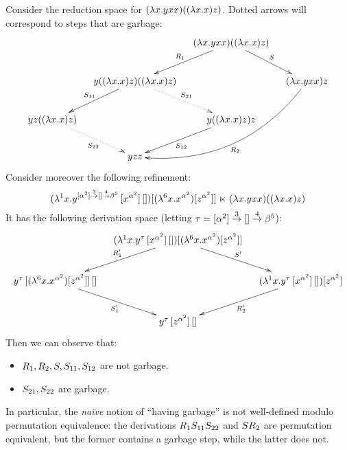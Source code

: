 \begin{example}
  Consider the reduction space for $(\lambda x. yxx)((\lambda x. x)z)$.
  Dotted arrows will correspond to steps that are garbage:
  \[
    \xymatrix@C=.4cm{
      &
      &
      (\lam{\var}{\vartwo\var\var})((\lam{\var}{\var})\varthree)
      \ar_-{\redex_1}[dl] \ar^-{\redextwo}[dr]
      &
    \\
      &
      \vartwo((\lam{\var}{\var})\varthree)((\lam{\var}{\var})\varthree)
      \ar_-{\redextwo_{11}}[dl]
      \ar@{.>}^-{\redextwo_{21}}[dr]
      &
      &
      (\lam{\var}{\vartwo\var\var})\varthree
      \ar@/^1cm/^{\redex_2}[ddll]
    \\
      \vartwo\varthree((\lam{\var}{\var})\varthree)
      \ar@{.>}_-{\redextwo_{22}}[dr]
      &
      &
      \vartwo((\lam{\var}{\var})\varthree)\varthree
      \ar^-{\redextwo_{12}}[dl]
      &
    \\
      &
      \vartwo\varthree\varthree
      &
      &
    }
  \]
  Consider moreover the following refinement:
  \[
    (\lambda^{1} x. y^{[\alpha^{2}] \overset{3}{\to} [] \overset{4}{\to} \beta^{5}}\,[x^{\alpha^2}]\,[])
    [(\lambda^{6} x. x^{\alpha^2})[z^{\alpha^2}]]
    \mathrel{\ltimes}
    (\lambda x. yxx)((\lambda x. x)z)
  \]
  It has the following derivation space (letting $\tau = [\alpha^{2}] \overset{3}{\to} [] \overset{4}{\to} \beta^{5}$):
  \[
    \xymatrix@C=.4cm{
      &
      (\lamp{1}{\var}{\vartwo^{\typ}\,[\var^{\alpha^2}]\,[]})
      [(\lamp{6}{\var}{\var^{\alpha^2}})[\varthree^{\alpha^2}]]
      \ar_-{\redex'_{1}}[dl]
      \ar^-{\redextwo'}[dr]
      &
    \\
      \vartwo^{\typ}\,[(\lamp{6}{\var}{\var^{\alpha^2}})[\varthree^{\alpha^2}]]\,[]
      \ar_-{\redextwo'_1}[dr]
      &
      &
      (\lamp{1}{\var}{\vartwo^{\typ}\,[\var^{\alpha^2}]\,[]}) [\varthree^{\alpha^2}]
      \ar^-{\redex'_2}[dl]
    \\
      &
      \vartwo^{\typ}\,[\varthree^{\alpha^2}]\,[]
      &
    }
  \]
  Then we can observe that:
  \begin{itemize}
  \item $R_1, R_2, S, S_{11}, S_{12}$ are not garbage.
  \item $S_{21}, S_{22}$ are garbage.
  \end{itemize}
  In particular, the {\em na\"ive} notion of ``having garbage'' is not well-defined modulo permutation equivalence:
  the derivations
  $R_1S_{11}S_{22}$
  and
  $SR_2$
  are permutation equivalent,
  but the former contains a garbage step, while the latter does not.
\end{example}


